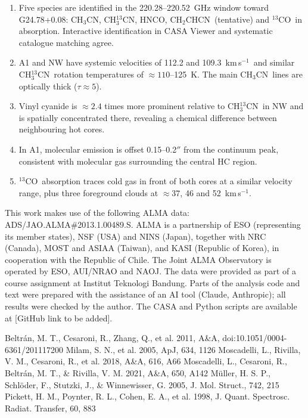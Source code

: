 \documentclass{aa}
\newcommand{\kms}{km\,s$^{-1}$}
\newcommand{\chcn}{CH$_3$CN}
\newcommand{\chtcn}{CH$_3^{13}$CN}
\newcommand{\vycn}{CH$_2$CHCN}
\newcommand{\tco}{$^{13}$CO}
\begin{document}
\begin{enumerate}
\item Five species are identified in the 220.28--220.52~GHz window toward G24.78+0.08: \chcn, \chtcn, HNCO, \vycn\ (tentative) and \tco\ in absorption. Interactive identification in CASA Viewer and systematic catalogue matching agree.
\item A1 and NW have systemic velocities of 112.2 and 109.3~\kms\ and similar \chtcn\ rotation temperatures of $\approx110$--125~K. The main \chcn\ lines are optically thick ($\tau\approx5$).
\item Vinyl cyanide is $\approx2.4$ times more prominent relative to \chtcn\ in NW and is spatially concentrated there, revealing a chemical difference between neighbouring hot cores.
\item In A1, molecular emission is offset 0.15--0.2$''$ from the continuum peak, consistent with molecular gas surrounding the central HC  region.
\item \tco\ absorption traces cold gas in front of both cores at a similar velocity range, plus three foreground clouds at $\approx37$, 46 and 52~\kms.
\end{enumerate}

\begin{acknowledgements}
This work makes use of the following ALMA data: ADS/JAO.ALMA\#2013.1.00489.S. ALMA is a partnership of ESO (representing its member states), NSF (USA) and NINS (Japan), together with NRC (Canada), MOST and ASIAA (Taiwan), and KASI (Republic of Korea), in cooperation with the Republic of Chile. The Joint ALMA Observatory is operated by ESO, AUI/NRAO and NAOJ. The data were provided as part of a course assignment at Institut Teknologi Bandung. Parts of the analysis code and text were prepared with the assistance of an AI tool (Claude, Anthropic); all results were checked by the author. The CASA and Python scripts are available at [GitHub link to be added].
\end{acknowledgements}

\begin{thebibliography}{}
 Beltr\'an, M. T., Cesaroni, R., Zhang, Q., et al. 2011, A\&A, doi:10.1051/0004-6361/201117200
 Milam, S. N., et al. 2005, ApJ, 634, 1126
 Moscadelli, L., Rivilla, V. M., Cesaroni, R., et al. 2018, A\&A, 616, A66
 Moscadelli, L., Cesaroni, R., Beltr\'an, M. T., \& Rivilla, V. M. 2021, A\&A, 650, A142
 M\"uller, H. S. P., Schl\"oder, F., Stutzki, J., \& Winnewisser, G. 2005, J. Mol. Struct., 742, 215
 Pickett, H. M., Poynter, R. L., Cohen, E. A., et al. 1998, J. Quant. Spectrosc. Radiat. Transfer, 60, 883
\end{thebibliography}
\end{document}
